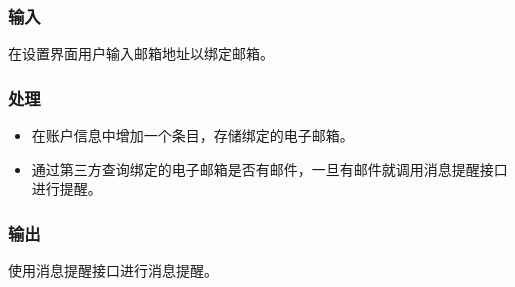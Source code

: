 \subsubsection{输入}
在设置界面用户输入邮箱地址以绑定邮箱。
\subsubsection{处理}
\begin{itemize}
  \item 在账户信息中增加一个条目，存储绑定的电子邮箱。
  \item 通过第三方查询绑定的电子邮箱是否有邮件，一旦有邮件就调用消息提醒接口进行提醒。
\end{itemize}
\subsubsection{输出}
使用消息提醒接口进行消息提醒。


